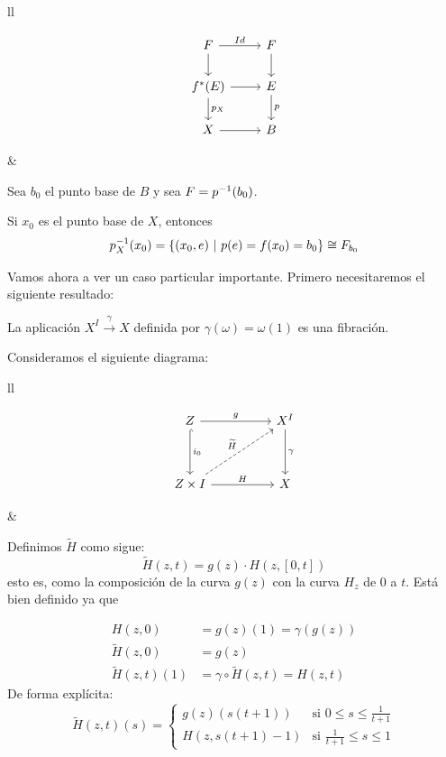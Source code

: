 \begin{tabular}{ll}
\begin{minipage}{0.3\textwidth}
\[
\begin{tikzcd}
F \rar{Id} \dar & F \dar \\
f^*(E) \rar \dar{p_X}  & E \dar{p} \\
X \rar & B
\end{tikzcd}
\]
\end{minipage}
&
\begin{minipage}{0.65\textwidth}
\begin{demo}
Sea $b_0$ el punto base de $B$ y sea $F = \nobreak p^{-1}(b_0)$. \par
Si $x_0$ es el punto base de $X$, entonces 
\[p_X^{-1}(x_0) = \nobreak \{ (x_0, e) \ \vert \ p(e) = f(x_0) = b_0\} \cong F_{b_0}\]
\end{demo}
\end{minipage}
\end{tabular}
Vamos ahora a ver un caso particular importante. Primero necesitaremos el siguiente resultado:
\begin{prop}
La aplicación $X^I \stackrel{\gamma}{\longrightarrow} X$ definida por $\gamma(\omega) = \omega(1)$ es una fibración.
\end{prop}
\begin{demo}
Consideramos el siguiente diagrama:\par
\begin{tabular}{ll}
\begin{minipage}{0.3\textwidth}
\[
\begin{tikzcd}
Z \arrow{rr}{g} \arrow[hook]{dd}{i_0} & & X^I \arrow{dd}{\gamma} \\
\\
Z \times I \arrow{rr}{H} \arrow[dashed]{uurr}{\widetilde{H}} & & X
\end{tikzcd}
\]
\end{minipage}
&
\begin{minipage}{0.65\textwidth}
Definimos $\widetilde{H}$ como sigue:
\[ \widetilde{H}(z,t) = g(z) \cdotp H(z, [0,t]) \]
esto es, como la composición de la curva $g(z)$ con la curva $H_z$ de $0$ a $t$. Está bien definido ya que

\end{minipage}
\end{tabular}
\begin{align*}
H(z,0) &= g(z)(1) = \gamma(g(z))  \\
\widetilde{H}(z,0) &= g(z) \\
\widetilde{H}(z,t)(1) &= \gamma \circ \widetilde{H}(z,t) = H(z,t) \end{align*}
De forma explícita:
\[
\widetilde{H}(z,t)(s) = 
\begin{cases}
g(z)(s(t+1)) & \text{si } 0 \leq s \leq \frac{1}{t+1} \\
H(z, s(t+1) -1) & \text{si } \frac{1}{t+1} \leq s \leq 1
\end{cases}
\]
\end{demo}
